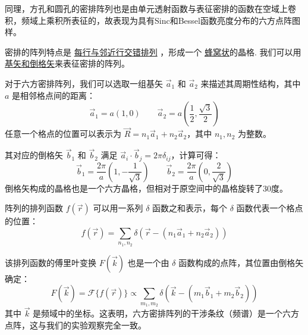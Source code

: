\documentclass[12pt]{article}
\begin{document}
\begin{center}
\end{center}

\vspace{1em}
\par
同理，方孔和圆孔的密排阵列也是由单元透射函数与表征密排的函数在空域上卷积，频域上乘积所表征的，故表现为具有Sinc和Bessel函数亮度分布的六方点阵图样。
\vspace{1em}
\par
密排的阵列特点是 \underline{每行与邻近行交错排列} ，形成一个 \underline{蜂窝状}的晶格.
我们可以用 \underline{基矢和倒格矢}来表征密排的阵列。
\par
对于六方密排阵列，我们可以选取一组基矢 \(\vec{a}_1\) 和 \(\vec{a}_2\) 来描述其周期性结构，其中 \(a\) 是相邻格点间的距离：
\[
\vec{a}_1 = a(1, 0) \qquad \vec{a}_2 = a(\frac{1}{2}, \frac{\sqrt{3}}{2})
\]
任意一个格点的位置可以表示为 \(\vec{R} = n_1 \vec{a}_1 + n_2 \vec{a}_2\)，其中 \(n_1, n_2\) 为整数。
\par
其对应的倒格矢 \(\vec{b}_1\) 和 \(\vec{b}_2\) 满足 \(\vec{a}_i \cdot \vec{b}_j = 2\pi \delta_{ij}\)，计算可得：
\[
\vec{b}_1 = \frac{2\pi}{a}(1, -\frac{1}{\sqrt{3}}) \qquad \vec{b}_2 = \frac{2\pi}{a}(0, \frac{2}{\sqrt{3}})
\]
倒格矢构成的晶格也是一个六方晶格，但相对于原空间中的晶格旋转了30度。
\par
阵列的排列函数 \(f(\vec{r})\) 可以用一系列 \(\delta\) 函数之和表示，每个 \(\delta\) 函数代表一个格点的位置：
\[
f(\vec{r}) = \sum_{n_1, n_2} \delta(\vec{r} - (n_1 \vec{a}_1 + n_2 \vec{a}_2))
\]
\par
该排列函数的傅里叶变换 \(F(\vec{k})\) 也是一个由 \(\delta\) 函数构成的点阵，其位置由倒格矢确定：
\[
F(\vec{k}) = \mathcal{F}\{f(\vec{r})\} \propto \sum_{m_1, m_2} \delta(\vec{k} - (m_1 \vec{b}_1 + m_2 \vec{b}_2))
\]
其中 \(\vec{k}\) 是频域中的坐标。这表明，六方密排阵列的干涉条纹（频谱）是一个六方点阵，这与我们的实验观察完全一致。
\end{document}
